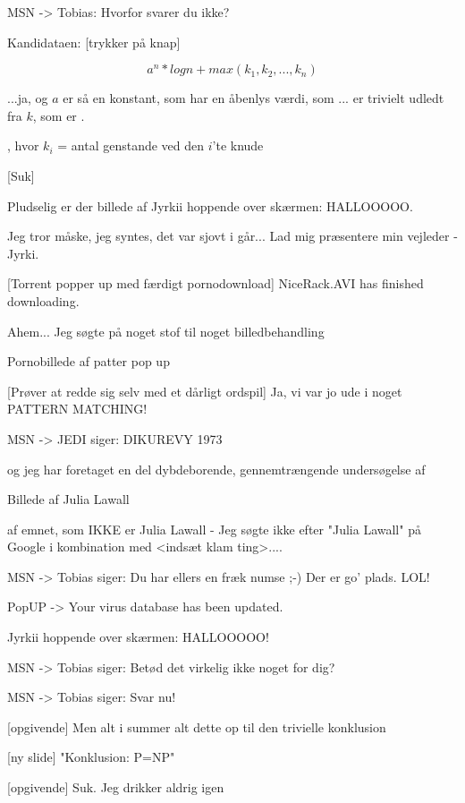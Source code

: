 \documentclass[a4paper,11pt]{article}
\begin{document}
\begin{sketch}
 MSN -> Tobias: Hvorfor svarer du ikke?

Kandidataen: [trykker på knap]

    $$a^n*logn + max(k_1, k_2, ... , k_n)$$

 ...ja, og $a$ er så en konstant, som har en åbenlys værdi, som ... er trivielt udledt fra $k$, som er .

 , hvor $k_i$ = antal genstande ved den $i$'te knude

 [Suk]

 Pludselig er der billede af Jyrkii hoppende over skærmen: HALLOOOOO.

 Jeg tror måske, jeg syntes, det var sjovt i går... Lad mig præsentere min vejleder - Jyrki.

 [Torrent popper up med færdigt pornodownload] NiceRack.AVI has finished downloading.

 Ahem... Jeg søgte på noget stof til noget billedbehandling

 Pornobillede af patter pop up

 [Prøver at redde sig selv med et dårligt ordspil] Ja, vi var jo ude i noget PATTERN MATCHING!

 MSN -> JEDI siger: DIKUREVY 1973

 og jeg har foretaget en del dybdeborende, gennemtrængende undersøgelse af 

 Billede af Julia Lawall

 af emnet, som IKKE er Julia Lawall -  Jeg søgte ikke efter "Julia Lawall" på Google i kombination med <indsæt klam ting>....


 MSN -> Tobias siger: Du har ellers en fræk numse ;-) Der er go' plads. LOL!

 PopUP ->  Your virus database has been updated.

 Jyrkii hoppende over skærmen: HALLOOOOO!

 MSN -> Tobias siger: Betød det virkelig ikke noget for dig?

 MSN -> Tobias siger:  Svar nu!

  [opgivende] Men alt i summer alt dette op til den trivielle konklusion 

  [ny slide] "Konklusion: P=NP"


[opgivende] Suk. Jeg drikker aldrig igen
 
\end{sketch}
\end{document}
